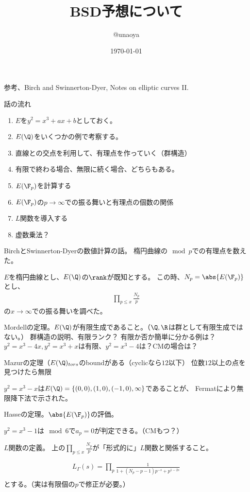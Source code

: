 \documentclass{jsarticle}
\title{BSD予想について}
\author{@unaoya}
\date{\today}
\begin{document}
\maketitle
参考、Birch and Swinnerton-Dyer, Notes on elliptic curves II.

話の流れ
\begin{enumerate}
\item $E$を$y^2=x^3+ax+b$としておく。
\item $E(\Q)$をいくつかの例で考察する。
\item 直線との交点を利用して、有理点を作っていく（群構造）
\item 有限で終わる場合、無限に続く場合、どちらもある。
\item $E(\F_p)$を計算する
\item $E(\F_p)$の$p \to \infty$での振る舞いと有理点の個数の関係
\item $L$関数を導入する
\item 虚数乗法？
\end{enumerate}


BirchとSwinnerton-Dyerの数値計算の話。
楕円曲線の$\mod p$での有理点を数えた。

$E$を楕円曲線とし、$E(\Q)$の$\rank$が既知とする。
この時、$N_p=\abs{E(\F_p)}$とし、
\begin{align*}
\prod_{p\leq x}\frac{N_p}{p}
\end{align*}
の$x \to \infty$での振る舞いを調べた。

Mordellの定理。$E(\Q)$が有限生成であること。（$\Q, \R$は群として有限生成ではない。）
群構造の説明、有限ランク？
有限か否か簡単に分かる例は？
$y^2=x^3-4x, y^2=x^3+x$は有限、$y^2=x^3-4$は？CMの場合は？

Mazurの定理（$E(\Q)_{tors}$のboundがある（cyclicなら$12$以下）
位数$12$以上の点を見つけたら無限

$y^2=x^3-x$は$E(\Q)=\{(0,0), (1,0), (-1,0), \infty\}$であることが、
Fermatにより無限降下法で示された。

Hasseの定理。$\abs{E(\F_p)}$の評価。

$y^2=x^3-1$は$\mod 6$で$a_p=0$が判定できる。（CMもつ？）

$L$関数の定義。
上の$\prod_{p\leq x}\frac{N_p}{p}$が「形式的に」$L$関数と関係すること。

\begin{align*}
L_\Gamma(s)=\prod_p\frac{1}{1+(N_p-p-1)p^{-s}+p^{1-2s}}\\
\end{align*}
とする。（実は有限個の$p$で修正が必要。）
\end{document}
